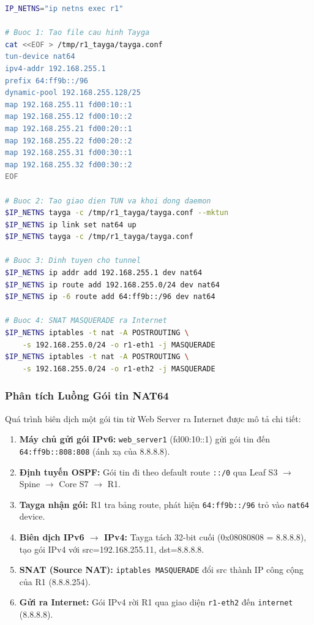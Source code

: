 \begin{lstlisting}[style=customcode, language=bash, caption={Kịch bản cấu hình NAT64 Tayga trên R1 (trích đoạn).}, label=lst:nat64_setup]
IP_NETNS="ip netns exec r1"

# Buoc 1: Tao file cau hinh Tayga
cat <<EOF > /tmp/r1_tayga/tayga.conf
tun-device nat64
ipv4-addr 192.168.255.1
prefix 64:ff9b::/96
dynamic-pool 192.168.255.128/25
map 192.168.255.11 fd00:10::1
map 192.168.255.12 fd00:10::2
map 192.168.255.21 fd00:20::1
map 192.168.255.22 fd00:20::2
map 192.168.255.31 fd00:30::1
map 192.168.255.32 fd00:30::2
EOF

# Buoc 2: Tao giao dien TUN va khoi dong daemon
$IP_NETNS tayga -c /tmp/r1_tayga/tayga.conf --mktun
$IP_NETNS ip link set nat64 up
$IP_NETNS tayga -c /tmp/r1_tayga/tayga.conf

# Buoc 3: Dinh tuyen cho tunnel
$IP_NETNS ip addr add 192.168.255.1 dev nat64
$IP_NETNS ip route add 192.168.255.0/24 dev nat64
$IP_NETNS ip -6 route add 64:ff9b::/96 dev nat64

# Buoc 4: SNAT MASQUERADE ra Internet
$IP_NETNS iptables -t nat -A POSTROUTING \
    -s 192.168.255.0/24 -o r1-eth1 -j MASQUERADE
$IP_NETNS iptables -t nat -A POSTROUTING \
    -s 192.168.255.0/24 -o r1-eth2 -j MASQUERADE
\end{lstlisting}

\subsubsection{Phân tích Luồng Gói tin NAT64}

Quá trình biên dịch một gói tin từ Web Server ra Internet được mô tả chi tiết:

\begin{enumerate}
    \item \textbf{Máy chủ gửi gói IPv6:} \texttt{web\_server1} (fd00:10::1) gửi gói tin đến \texttt{64:ff9b::808:808} (ánh xạ của 8.8.8.8).
    \item \textbf{Định tuyến OSPF:} Gói tin đi theo default route \texttt{::/0} qua Leaf S3 $\rightarrow$ Spine $\rightarrow$ Core S7 $\rightarrow$ R1.
    \item \textbf{Tayga nhận gói:} R1 tra bảng route, phát hiện \texttt{64:ff9b::/96} trỏ vào \texttt{nat64} device.
    \item \textbf{Biên dịch IPv6 $\rightarrow$ IPv4:} Tayga tách 32-bit cuối (0x08080808 = 8.8.8.8), tạo gói IPv4 với src=192.168.255.11, dst=8.8.8.8.
    \item \textbf{SNAT (Source NAT):} \texttt{iptables MASQUERADE} đổi src thành IP công cộng của R1 (8.8.8.254).
    \item \textbf{Gửi ra Internet:} Gói IPv4 rời R1 qua giao diện \texttt{r1-eth2} đến \texttt{internet} (8.8.8.8).
\end{enumerate}

